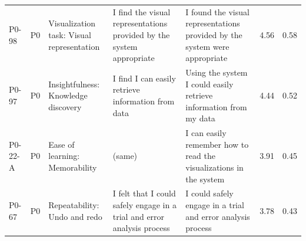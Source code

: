 \begin{table}[tbp]
\begin{tabular}{llp{2.6cm}p{4.6cm}p{4.6cm}rr}
P0-98 & P0 & Visualization task: Visual representation & I find the visual representations provided by the system appropriate & I found the visual representations provided by the system were appropriate & 4.56 & 0.58 \\
P0-97 & P0 & Insightfulness: Knowledge discovery & I find I can easily retrieve information from data & Using the system I could easily retrieve information from my data & 4.44 & 0.52 \\
P0-22-A & P0 & Ease of learning: Memorability & (same) & I can easily remember how to read the visualizations in the system & 3.91 & 0.45 \\
P0-67 & P0 & Repeatability: Undo and redo & I felt that I could safely engage in a trial and error analysis process & I could safely engage in a trial and error analysis process & 3.78 & 0.43 \\
\bottomrule
\end{tabular}
\end{table}
